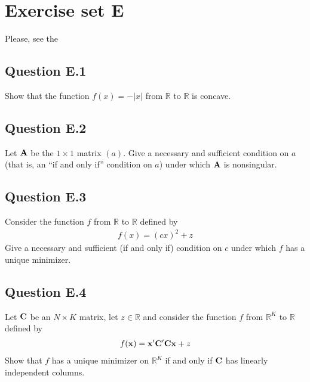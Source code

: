 \documentclass[letterpaper,10pt,english]{jupyterBook}
\begin{document}
\sphinxstepscope


\chapter{Exercise set E}
\label{\detokenize{06.exercises.E:exercise-set-e}}\label{\detokenize{06.exercises.E::doc}}
\sphinxAtStartPar
Please, see the
{\hyperref[\detokenize{02.exercises.A::doc}]{}}


\section{Question E.1}
\label{\detokenize{06.exercises.E:question-e-1}}
\sphinxAtStartPar
Show that the function \(f(x) = - |x|\) from \(\mathbb{R}\) to \(\mathbb{R}\) is concave.


\section{Question E.2}
\label{\detokenize{06.exercises.E:question-e-2}}
\sphinxAtStartPar
Let \({\bf A}\) be the \(1 \times 1\) matrix \((a)\). Give a necessary and
sufficient condition on \(a\) (that is, an “if and only if” condition on
\(a\)) under which \({\bf A}\) is nonsingular.


\section{Question E.3}
\label{\detokenize{06.exercises.E:question-e-3}}
\sphinxAtStartPar
Consider the function \(f\) from \(\mathbb{R}\) to \(\mathbb{R}\) defined by
\begin{equation*}
\begin{split}
%
f(x) = (c x)^2 + z
%
\end{split}
\end{equation*}
\sphinxAtStartPar
Give a necessary and sufficient (if and only if) condition on \(c\) under
which \(f\) has a unique minimizer.


\section{Question E.4}
\label{\detokenize{06.exercises.E:question-e-4}}
\sphinxAtStartPar
Let \({\bf C}\) be an \(N \times K\) matrix, let \(z \in \mathbb{R}\) and consider the function
\(f\) from \(\mathbb{R}^K\) to \(\mathbb{R}\) defined by
\begin{equation*}
\begin{split}
%
f({\bf x}) = {\bf x}' {\bf C}' {\bf C} {\bf x} + z
%
\end{split}
\end{equation*}
\sphinxAtStartPar
Show that \(f\) has a unique minimizer on \(\mathbb{R}^K\) if and only if \({\bf C}\)
has linearly independent columns.
\end{document}

